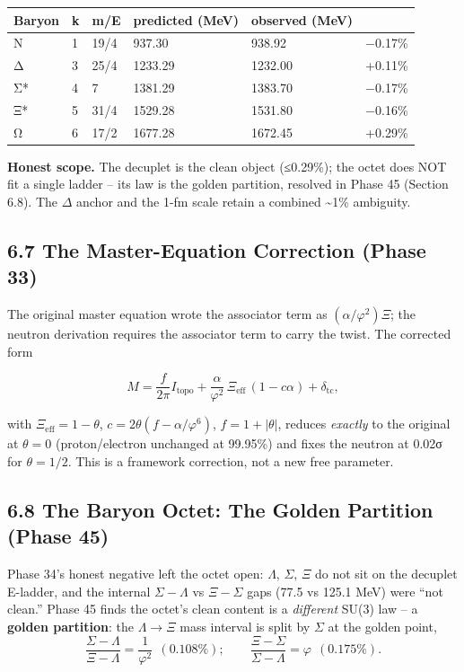 \documentclass[
  11pt,
]{article}
\begin{document}
\begin{longtable}[]{@{}llllll@{}}
\toprule\noalign{}
Baryon & k & m/E & predicted (MeV) & observed (MeV) & \\
\midrule\noalign{}
\endhead
\bottomrule\noalign{}
\endlastfoot
N & 1 & 19/4 & 937.30 & 938.92 & −0.17\% \\
Δ & 3 & 25/4 & 1233.29 & 1232.00 & +0.11\% \\
Σ* & 4 & 7 & 1381.29 & 1383.70 & −0.17\% \\
Ξ* & 5 & 31/4 & 1529.28 & 1531.80 & −0.16\% \\
Ω & 6 & 17/2 & 1677.28 & 1672.45 & +0.29\% \\
\end{longtable}

\textbf{Honest scope.} The decuplet is the clean object (≤0.29\%); the
octet does NOT fit a single ladder -- its law is the golden partition,
resolved in Phase 45 (Section 6.8). The \(\Delta\) anchor and the 1-fm
scale retain a combined \textasciitilde1\% ambiguity.

\subsection{6.7 The Master-Equation Correction (Phase
33)}\label{the-master-equation-correction-phase-33}

The original master equation wrote the associator term as
\((\alpha/\varphi^2)\Xi\); the neutron derivation requires the
associator term to carry the twist. The corrected form

\[M = \frac{f}{2\pi}I_{\text{topo}} + \frac{\alpha}{\varphi^2}\,\Xi_{\text{eff}}\,(1 - c\alpha) + \delta_{\text{tc}},\]

with \(\Xi_{\text{eff}} = 1 - \theta\),
\(c = 2\theta(f - \alpha/\varphi^6)\), \(f = 1 + |\theta|\), reduces
\emph{exactly} to the original at \(\theta = 0\) (proton/electron
unchanged at 99.95\%) and fixes the neutron at 0.02σ for
\(\theta = 1/2\). This is a framework correction, not a new free
parameter.

\subsection{6.8 The Baryon Octet: The Golden Partition (Phase
45)}\label{the-baryon-octet-the-golden-partition-phase-45}

Phase 34's honest negative left the octet open: \(\Lambda\), \(\Sigma\),
\(\Xi\) do not sit on the decuplet E-ladder, and the internal
\(\Sigma{-}\Lambda\) vs \(\Xi{-}\Sigma\) gaps (77.5 vs 125.1 MeV) were
``not clean.'' Phase 45 finds the octet's clean content is a
\emph{different} SU(3) law -- a \textbf{golden partition}: the
\(\Lambda \to \Xi\) mass interval is split by \(\Sigma\) at the golden
point,
\[\frac{\Sigma-\Lambda}{\Xi-\Lambda} = \frac{1}{\varphi^2}\ \ (0.108\%); \qquad \frac{\Xi-\Sigma}{\Sigma-\Lambda} = \varphi\ \ (0.175\%).\]
\end{document}
